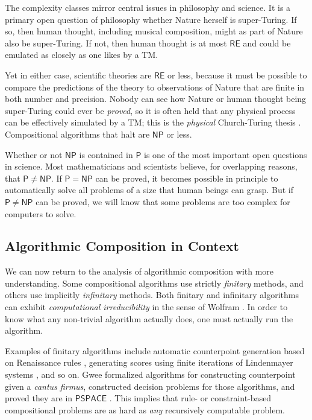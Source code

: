 \documentclass[]{interact}
\theoremstyle{plain}%
\theoremstyle{definition}
\theoremstyle{remark}
\begin{document}
\noindent The complexity classes mirror central issues in philosophy and science. It is a primary open question of philosophy whether Nature herself is super-Turing. If so, then human thought, including musical composition, might as part of Nature also be super-Turing. If not, then human thought is at most $\mathsf{RE}$ and could be emulated as closely as one likes by a TM. 

Yet in either case, scientific theories are $\mathsf{RE}$ or less, because it must be possible to compare the predictions of the theory to observations of Nature that are finite in both number and precision. Nobody can see how Nature or human thought being super-Turing could ever be \emph{proved}, so it is often held that any physical process can be effectively simulated by a TM; this is the \emph{physical} Church-Turing thesis \citep{aaronson2005npcomplete, sep-church-turing}. Compositional algorithms that halt are $\mathsf{NP}$ or less.

Whether or not $\mathsf{NP}$ is contained in $\mathsf{P}$ is one of the most important open questions in science. Most mathematicians and scientists believe, for overlapping reasons, that $\mathsf{P} \ne \mathsf{NP}$. If $\mathsf{P} = \mathsf{NP}$  can be proved, it becomes possible in principle to automatically solve all problems of a size that human beings can grasp. But if $\mathsf{P} \ne \mathsf{NP}$ can be proved, we will know that some problems are too complex for computers to solve.
 
\subsection{Algorithmic Composition in Context}

We can now return to the analysis of algorithmic composition with more understanding. Some compositional algorithms use strictly \emph{finitary} methods, and others use implicitly \emph{infinitary} methods. Both finitary and infinitary algorithms can exhibit \emph{computational irreducibility} in the sense of Wolfram \citep{wolfram1985undecidability}. In order to know what any non-trivial algorithm actually does, one must actually run the algorithm.

Examples of finitary algorithms include automatic counterpoint generation based on Renaissance rules \citep{schottstaedt1989automatic, taube1991common}, generating scores using finite iterations of Lindenmayer systems \citep{mccormack1991lsystems}, and so on. Gwee formalized algorithms for constructing counterpoint given a \emph{cantus firmus}, constructed decision problems for those algorithms, and proved they are in $\mathsf{PSPACE}$ \citep{gwee2002complexity, gwee2013music}. This implies that rule- or constraint-based compositional problems are as hard as \emph{any} recursively computable problem.
\end{document}

